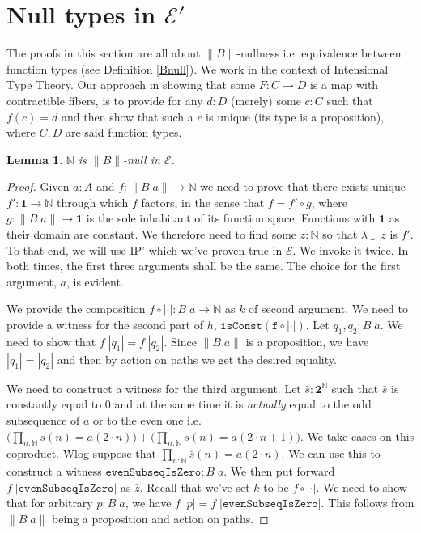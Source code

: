 \documentclass[12pt]{report}
\newtheorem{lem}[thm]{Lemma}
\theoremstyle{definition}
\begin{document}
\section{Null types in $\mathcal{E}'$}
The proofs in this section are all about $\lVert B \rVert$-nullness i.e. equivalence between function types (see Definition \ref{Bnull}). 
We work in the context of Intensional Type Theory. 
Our approach in showing that some $F: C\rightarrow D$ is a map with contractible fibers, is to provide for any $d :D$ (merely) some $c :C$ such that $f(c) = d$ and then show that such a $c$ is unique (its type is a proposition), where $C,D$ are said function types. 
\begin{lem}\label{NisBnull}
$\mathbb{N}$ is $\lVert B \rVert$-null in $\mathcal{E}$.
\end{lem}
\begin{proof}
Given $a : A$ and $f : \lVert B\; a \rVert \rightarrow \mathbb{N}$ we need to prove that there exists unique $f' : \mathbf{1} \rightarrow \mathbb{N}$ through which $f$ factors, in the sense that $f = f' \circ g$, where $g : \lVert B\; a \rVert \rightarrow \mathbf{1}$ is the sole inhabitant of its function space. 
Functions with $\mathbf{1}$ as their domain are constant. 
We therefore need to find some $z : \mathbb{N}$ so that $\lambda\; \_.\; z$ is $f'$. 
To that end, we will use IP' which we've proven true in $\mathcal{E}$. 
We invoke it twice. 
In both times, the first three arguments shall be the same. 
The choice for the first argument, $a$, is evident. 

We provide the composition $f \circ |\cdot| : B\; a \rightarrow \mathbb{N}$ as $k$ of second argument. 
We need to provide a witness for the second part of $h$, $\mathtt{isConst(f \circ |\cdot|)}$. 
Let $q_1,q_2 : B\;a$. 
We need to show that $f\;|q_1| = f\; |q_2|$. 
Since $\lVert B\; a\rVert$ is a proposition, we have $|q_1| = |q_2|$ and then by action on paths we get the desired equality.

We need to construct a witness for the third argument. 
Let $\bar{s} : \mathbf{2}^\mathbb{N}$ such that $\bar{s}$ is constantly equal to $0$ and at the same time it is \textit{actually} equal to the odd subsequence of $a$ or to the even one i.e. $\big(\prod_{n : \mathbb{N}} \bar{s}(n) = a(2 \cdot n)\big) + \big(\prod_{n : \mathbb{N}} \bar{s}(n) = a(2\cdot n +1)\big)$. 
We take cases on this coproduct. 
Wlog suppose that $\prod_{n : \mathbb{N}} \bar{s}(n) = a(2 \cdot n)$. 
We can use this to construct a witness $\mathtt{evenSubseqIsZero} : B\;a$. 
We then put forward $f\;|\mathtt{evenSubseqIsZero}|$ as $\bar{z}$. 
Recall that we've set $k$ to be $f\circ |\cdot|$.
We need to show that for arbitrary $p : B\;a $, we have $f\; |p| = f\;|\mathtt{evenSubseqIsZero}|$. 
This follows from $\lVert B\;a\rVert$ being a proposition and action on paths. 


\end{proof}
\end{document}
